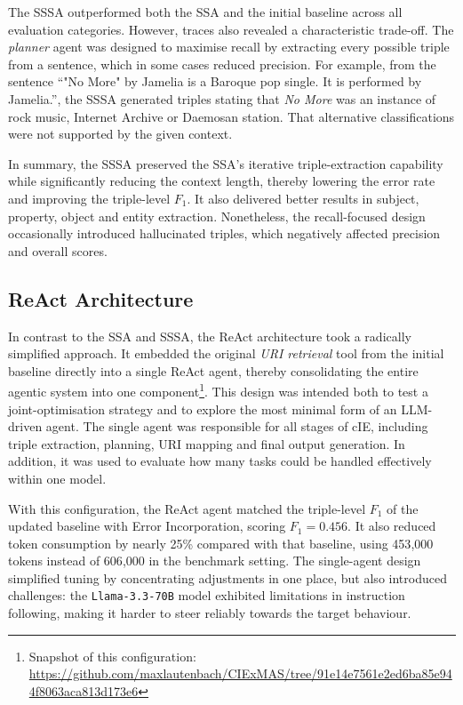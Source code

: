 \documentclass[a4paper,oneside,bibliography=totoc]{scrbook}
\begin{document}
The \ac{SSSA} outperformed both the \ac{SSA} and the initial baseline across all evaluation categories. However, traces also revealed a characteristic trade-off. The \textit{planner} agent was designed to maximise recall by extracting every possible triple from a sentence, which in some cases reduced precision. For example, from the sentence \enquote{"No More" by Jamelia is a Baroque pop single. It is performed by Jamelia.}, the \ac{SSSA} generated triples stating that \textit{No More} was an instance of rock music, Internet Archive or Daemosan station. That alternative classifications were not supported by the given context.

In summary, the \ac{SSSA} preserved the \ac{SSA}’s iterative triple-extraction capability while significantly reducing the context length, thereby lowering the error rate and improving the triple-level $F_{1}$. It also delivered better results in subject, property, object and entity extraction. Nonetheless, the recall-focused design occasionally introduced hallucinated triples, which negatively affected precision and overall scores.

\subsection{ReAct Architecture}
\label{subsec:one_agent_architecture_tool_usage}

In contrast to the \ac{SSA} and \ac{SSSA}, the ReAct architecture took a radically simplified approach. It embedded the original \textit{URI retrieval} tool from the initial baseline directly into a single ReAct agent, thereby consolidating the entire agentic system into one component\footnote{Snapshot of this configuration: \url{https://github.com/maxlautenbach/CIExMAS/tree/91e14e7561e2ed6ba85e944f8063aca813d173e6}}. This design was intended both to test a joint-optimisation strategy and to explore the most minimal form of an \ac{LLM}-driven agent. The single agent was responsible for all stages of \ac{cIE}, including triple extraction, planning, URI mapping and final output generation. In addition, it was used to evaluate how many tasks could be handled effectively within one model.

With this configuration, the ReAct agent matched the triple-level $F_{1}$ of the updated baseline with Error Incorporation, scoring $F_{1}=0.456$. It also reduced token consumption by nearly 25\% compared with that baseline, using 453{,}000 tokens instead of 606{,}000 in the benchmark setting. The single-agent design simplified tuning by concentrating adjustments in one place, but also introduced challenges: the \texttt{Llama-3.3-70B} model exhibited limitations in instruction following, making it harder to steer reliably towards the target behaviour.
\end{document}

